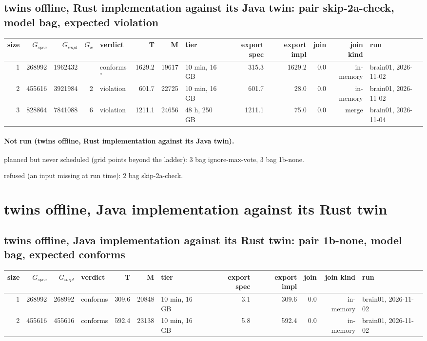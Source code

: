 \documentclass[10pt]{article}
\begin{document}
\subsection*{twins offline, Rust implementation against its Java twin: pair \textsf{skip-2a-check}, model bag, expected violation}
\begin{longtable}{@{}rrrrlrrlrrrrl@{}}
\toprule
size & $G_{\mathit{spec}}$ & $G_{\mathit{impl}}$ & $G_x$ & verdict & T & M & tier & export spec & export impl & join & join kind & run \\
\midrule
\endhead
\color{red} 1 & 268992 & 1962432 &  & conforms$^{\ast}$ & 1629.2 & 19617 & 10 min, 16 GB & 315.3 & 1629.2 & 0.0 & in-memory & brain01, 2026-11-02 \\
\color{red} 2 & 455616 & 3921984 & 2 & violation & 601.7 & 22725 & 10 min, 16 GB & 601.7 & 28.0 & 0.0 & in-memory & brain01, 2026-11-02 \\
\color{blue} 3 & 828864 & 7841088 & 6 & violation & 1211.1 & 24656 & 48 h, 250 GB & 1211.1 & 75.0 & 0.0 & merge & brain01, 2026-11-04 \\
\bottomrule
\end{longtable}
\paragraph{Not run (twins offline, Rust implementation against its Java twin).}
planned but never scheduled (grid points beyond the ladder): 3 bag ignore-max-vote, 3 bag 1b-none.\par
refused (an input missing at run time): 2 bag skip-2a-check.\par
\section*{twins offline, Java implementation against its Rust twin}
\subsection*{twins offline, Java implementation against its Rust twin: pair \textsf{1b-none}, model bag, expected conforms}
\begin{longtable}{@{}rrrlrrlrrrrl@{}}
\toprule
size & $G_{\mathit{spec}}$ & $G_{\mathit{impl}}$ & verdict & T & M & tier & export spec & export impl & join & join kind & run \\
\midrule
\endhead
\color{red} 1 & 268992 & 268992 & conforms & 309.6 & 20848 & 10 min, 16 GB & 3.1 & 309.6 & 0.0 & in-memory & brain01, 2026-11-02 \\
\color{red} 2 & 455616 & 455616 & conforms & 592.4 & 23138 & 10 min, 16 GB & 5.8 & 592.4 & 0.0 & in-memory & brain01, 2026-11-02 \\
\bottomrule
\end{longtable}
\end{document}
